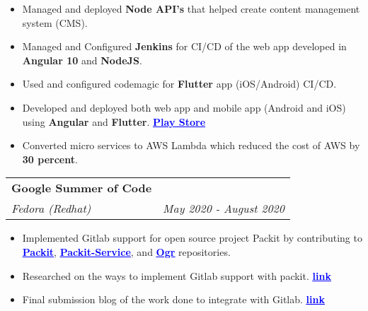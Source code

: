 \documentclass[a4paper,6pt]{article}
\begin{document}
\small
\begin{itemize}
	\itemsep0em
	\item Managed and deployed \textcolor{mygray}{\textbf{Node API's}} that helped create content management system (CMS).
	\item Managed and Configured \textcolor{mygray}{\textbf{Jenkins}} for CI/CD of the web app developed in \textcolor{mygray}{\textbf{Angular 10}} and \textcolor{mygray}{\textbf{NodeJS}}.
	\item Used and configured codemagic for \textcolor{mygray}{\textbf{Flutter}} app (iOS/Android) CI/CD.
	\item Developed and deployed both web app and mobile app (Android and iOS) using \textcolor{mygray}{\textbf{Angular}} and \textcolor{mygray}{\textbf{Flutter}}. \href{https://play.google.com/store/apps/details?id=com.Newsg8r}{\textcolor{blue}{\textbf{\underline{Play Store}}}}
	\item Converted micro services to AWS Lambda which reduced the cost of AWS by \textcolor{mygray}{\textbf{30 percent}}.
\end{itemize}
\normalsize


\vspace{7px}
\begin{tabularx}{\textwidth}{X r}
	\large{\textbf{Google Summer of Code}} \vspace{1px} & \\
	\textit{\small Fedora (Redhat)}& \textit{May 2020 - August 2020} \\
\end{tabularx}

\small
\begin{itemize}
	\itemsep0em
	\item Implemented Gitlab support for open source project Packit by contributing to \href{https://github.com/packit/packit/pulls/shreyaspapi}{\textcolor{blue}{\textbf{\underline{Packit}}}}, \href{https://github.com/packit/packit-service/pulls/shreyaspapi}{\textcolor{blue}{\textbf{\underline{Packit-Service}}}}, and \href{https://github.com/packit/ogr/pulls/shreyaspapi}{\textcolor{blue}{\textbf{\underline{Ogr}}}} repositories.
	\item Researched on the ways to implement Gitlab support with packit. \href{https://github.com/packit/research/tree/master/gitlab_integration}{\textcolor{blue}{\textbf{\underline{link}}}}
	\item Final submission blog of the work done to integrate with Gitlab. \href{https://shreyaspapi.medium.com/gsoc-gitlab-support-in-packit-service-fedora-54df1024b176}{\textcolor{blue}{\textbf{\underline{link}}}}
\end{itemize}
\normalsize
\end{document}
